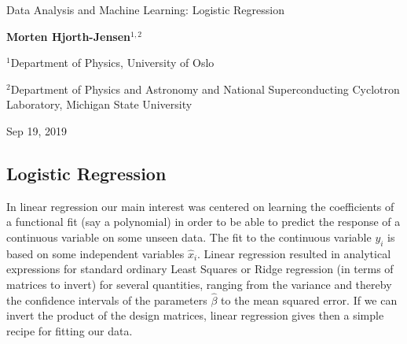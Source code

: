 \documentclass[%
oneside,                 %
final,                   %
10pt]{article}
\begin{document}

\newcommand{\exercisesection}[1]{\subsection*{#1}}






\thispagestyle{empty}

\begin{center}
{\LARGE\bf
\begin{spacing}{1.25}
Data Analysis and Machine Learning: Logistic Regression
\end{spacing}
}
\end{center}


\begin{center}
{\bf Morten Hjorth-Jensen${}^{1, 2}$} \\ [0mm]
\end{center}

\begin{center}
\centerline{{\small ${}^1$Department of Physics, University of Oslo}}
\centerline{{\small ${}^2$Department of Physics and Astronomy and National Superconducting Cyclotron Laboratory, Michigan State University}}
\end{center}
    

\begin{center}
Sep 19, 2019
\end{center}

\vspace{1cm}


\subsection{Logistic Regression}

In linear regression our main interest was centered on learning the
coefficients of a functional fit (say a polynomial) in order to be
able to predict the response of a continuous variable on some unseen
data. The fit to the continuous variable $y_i$ is based on some
independent variables $\hat{x}_i$. Linear regression resulted in
analytical expressions for standard ordinary Least Squares or Ridge
regression (in terms of matrices to invert) for several quantities,
ranging from the variance and thereby the confidence intervals of the
parameters $\hat{\beta}$ to the mean squared error. If we can invert
the product of the design matrices, linear regression gives then a
simple recipe for fitting our data.
\end{document}
